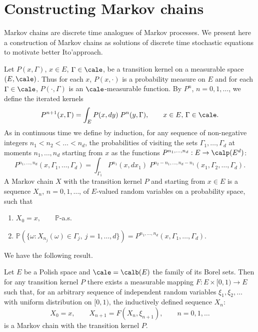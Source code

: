 \documentclass[preprint]{imsart}
\def\P{\mathbb P}
\begin{document}
{\section{Constructing Markov chains}

Markov chains are discrete time analogues of Markov processes. We
present here a construction of Markov chains as solutions of
discrete time stochastic equations to motivate better
Ito'approach.

Let $P(x,\Gamma)$,  $x\in E$, $\Gamma\in\cale$, be a transition
kernel on a
measurable space $(E,\cale)$.
Thus for each $x$, $P(x,\cdot)$ is a probability measure on $E$
and for each $\Gamma\in\cale$, $P(\cdot,\Gamma)$ is an
$\cale$-measurable function. By $P^n$, $n=0,1,\ldots$, we define
the iterated kernels
$$
P^{n+1}(x,\Gamma)=\int_E P(x,dy)\; P^n(y,\Gamma),
\qquad x\in E,\, \Gamma \in \cale.
$$
As in continuous time we define by induction, for any sequence of
non-negative integers $n_1<n_2<\ldots < n_d$, the
probabilities of visiting the sets $\Gamma_1,\ldots,\Gamma_d$ at
moments $n_1,\ldots , n_d$ starting from $x$ as the functions
$P^{n_1,\ldots , n_d}:E\to \calp(E^d)$:
$$
P^{n_1,\ldots , n_d}(x,\Gamma_1,\ldots,\Gamma_d)=
\int_{\Gamma_1} P^{n_1}(x,dx_1)\;
P^{n_2-n_1,\ldots , n_d-n_1}(x_1,\Gamma_2,\ldots,\Gamma_d).
$$
A Markov chain $X$ with the transition kernel $P$ and starting
from $x\in E$ is a sequence $X_n$, $n=0,1,\ldots$, of $E$-valued
random variables on a probability space, such that
\begin{enumerate}
\item[1)]
$X_0=x, \qquad \P$-a.s.
\item[2)] $ \P(\{\omega: X_{n_j}(\omega)\in\Gamma_j,\
j=1,\ldots,d\})
=P^{n_1,\ldots,n_d}(x,\Gamma_1,\ldots,\Gamma_d)$.
\end{enumerate}
We have the following result.

\begin{Theorem}
  Let $E$ be a Polish space and $\cale=\calb(E)$ the family of its
  Borel sets. Then for any transition kernel $P$ there exists a
  measurable mapping $F:E\times [0,1)\to E$
  such that, for an arbitrary sequence of independent random
  variables $\xi_1,\xi_2,\ldots $ with uniform distribution on
  $[0,1)$, the inductively defined sequence $X_n$:
\begin{equation}\label{ricorsiva}
  X_0=x,\qquad X_{n+1}=F(X_n, \xi_{n+1}),\qquad
  n=0,1,\ldots
\end{equation}
is a Markov chain with the transition kernel $P$.
\end{Theorem}

}
\end{document}
